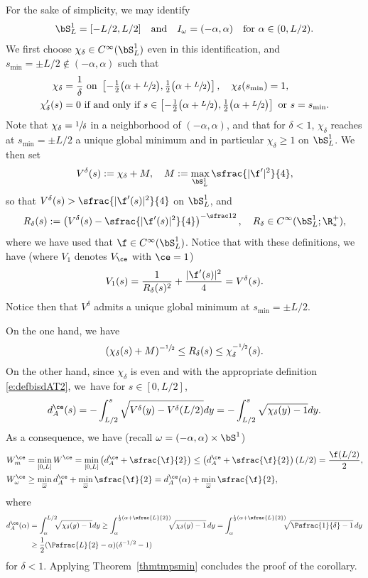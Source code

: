 For the sake of simplicity, we may identify
\[
\bS^1_L = [-L/2,L/2]\quad\text{and}\quad I_\omega= (-\alpha,\alpha)\quad\text{for }\alpha \in (0,L/2).
\]
We first choose $\chi_\delta \in C^\infty(\bS^1_L)$ even in this identification, and $s_{\min} = \pm L/2 \notin (-\alpha,\alpha)$ such that
\begin{align*}
\chi_\delta &=\frac{1}{\delta} \text{ on } \left[-\tfrac12\big(\alpha+\sfrac{L}{2}\big),\tfrac12\big(\alpha+\sfrac{L}{2}\big) \right], \quad \chi_\delta(s_{\min}) = 1, \\
\chi_\delta'(s) &= 0 \text{ if and only if } s\in \left[-\tfrac12\big(\alpha+\sfrac{L}{2}\big),\tfrac12\big(\alpha+\sfrac{L}{2}\big) \right] \text{ or } s= s_{\min}.
\end{align*}
Note that $\chi_\delta=\sfrac{1}{\delta}$ in a neighborhood of $(-\alpha, \alpha)$, and that for $\delta<1$, $\chi_\delta$ reaches at $s_{\min}=\pm L/2$ a unique global minimum and in particular $\chi_\delta \geq 1$ on $\bS^1_L$.
We then set
\[
V^\delta(s) := \chi_\delta +M, \quad M:= \max_{\bS^1_L}\sfrac{|\f'|^2}{4},
\]
so that $V^\delta(s)>\sfrac{|\f'(s)|^2}{4}$ on $\bS^1_L$, and
\[
R_\delta(s) := \left(V^\delta(s) - \sfrac{|\f'(s)|^2}{4} \right)^{-\sfrac12}, \quad R_\delta \in C^\infty(\bS^1_L; \R^+_*),
\]
where we have used that $\f\in C^{\infty}(\bS^1_L)$.
Notice that with these definitions, we have (where $V_1$ denotes $V_\ce$ with $\ce=1$)
\[
V_1 (s) = \frac{1}{R_\delta(s)^2} + \frac{|\f'(s)|^2}{4} = V^\delta(s).
\]
Notice then that $V^\delta$ admits a unique global minimum at $s_{\min} =\pm L/2$.

On the one hand, we have
\[
(\chi_\delta(s) +M)^{-\sfrac12}\leq R_\delta(s) \leq \chi_\delta^{-\sfrac12}(s).
\]
On the other hand, since $\chi_\delta$ is even and with the appropriate definition \eqref{e:defbisdAT2}, we~have for $s\in [0, L/2]$,
\[
d_A^{\ce}(s) = - \int_{L/2}^s \sqrt{ V^\delta(y)- V^\delta(L/2)} dy
= - \int_{L/2}^s \sqrt{\chi_\delta(y) - 1} dy.
\]
As a consequence, we have (recall $\omega = (-\alpha,\alpha) \times \bS^1$)
\begin{align*}
W^{\ce}_m & = \min_{[0,L]}W^{\ce} = \min_{[0,L]} \left( d_A^{\ce} +\sfrac{\f}{2} \right) \leq \left( d_A^{\ce} +\sfrac{\f}{2} \right) (L/2) = \frac{\f(L/2)}{2}, \\
W^{\ce}_{\omega} & \geq \min_{\overline{\omega}} d_{A}^{\ce} +\min_{\overline{\omega}} \sfrac{\f}{2} = d_{A}^{\ce}(\alpha) +\min_{\overline{\omega}} \sfrac{\f}{2},
\end{align*}
where
\begin{align*}
d_A^{\ce} (\alpha) &=\int_\alpha^{L/2}\hspace*{-2mm} \sqrt{\chi_\delta(y) - 1} dy \geq \int_\alpha^{\frac12(\alpha+\sfrac{L}{2})}\hspace*{-2mm} \sqrt{\chi_\delta(y) - 1}\, dy
=\int_\alpha^{\frac12(\alpha+\sfrac{L}{2})}\hspace*{-2mm} \sqrt{\Psfrac{1}{\delta} - 1}\, dy \\
& \geq \frac12(\Psfrac{L}{2}-\alpha) (\delta^{-1/2}-1)
\end{align*}
for $\delta<1$. Applying Theorem~\ref{thmtmpsmin} concludes the proof of the corollary.
\enp


